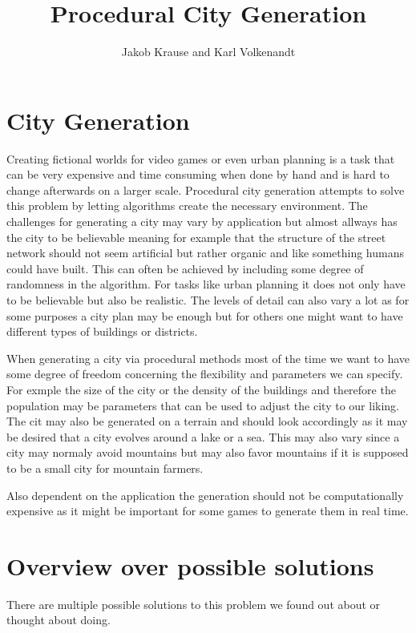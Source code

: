 \documentclass{scrartcl}
\title{Procedural City Generation}
\author{Jakob Krause and Karl Volkenandt}
\begin{document}
\maketitle
\tableofcontents
\newpage


\section{City Generation}
Creating fictional worlds for video games or even urban planning is a task that
can be very expensive and time consuming when done by hand and is hard to change
afterwards on a larger scale.
Procedural city generation attempts to solve this problem by letting algorithms
create the necessary environment. The challenges for generating a city may vary
by application but almost allways has the city to be believable
meaning for example that the structure of the street network should not seem
artificial but rather organic and like something humans could have built.
This can often be achieved by including some degree of randomness in the algorithm.
For tasks like urban planning it does not only have to be believable but also
be realistic. The levels of detail can also vary a lot as for some purposes a
city plan may be enough but for others one might want to have different types of
buildings or districts.

When generating a city via procedural methods most of the time we want to have
some degree of freedom concerning the flexibility and parameters we can specify.
For exmple the size of the city or the density of the buildings and therefore the
population may be parameters that can be used to adjust the city to our liking.
The cit may also be generated on a terrain and should look accordingly as it
may be desired that a city evolves around a lake or a sea. This may also vary
since a city may normaly avoid mountains but may also favor mountains if it is
supposed to be a small city for mountain farmers.

Also dependent on the application the generation should not be computationally
expensive as it might be important for some games to generate them in real time.







\section{Overview over possible solutions}
There are multiple possible solutions to this problem we found out about or thought
about doing.
\end{document}
